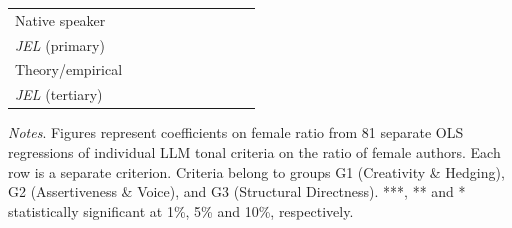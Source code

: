 \begin{table}
\begin{threeparttable}
\begin{tabular}{p{4.5cm}S@{}S@{}S@{}S@{}S@{}S@{}S@{}S@{}S@{}}
            Native speaker                &               &               &               &               &           {}   &           {}   &           {}   &           {}   &           {}   \\
            \textit{JEL} (primary)        &               &               &               &               &               &               &           {}   &               &               \\
            Theory/empirical              &               &               &               &               &               &               &               &           {}   &               \\
            \textit{JEL} (tertiary)       &               &               &               &               &               &               &               &               &           {}   \\
            \bottomrule
        \end{tabular}
        \begin{tablenotes}
            \tiny
            \item \textit{Notes}. Figures represent coefficients on female ratio from 81 separate OLS regressions of individual LLM tonal criteria on the ratio of female authors. Each row is a separate criterion. Criteria belong to groups G1 (Creativity \& Hedging), G2 (Assertiveness \& Voice), and G3 (Structural Directness). ***, ** and * statistically significant at 1\%, 5\% and 10\%, respectively.
        \end{tablenotes}
    \end{threeparttable}

\end{table}
